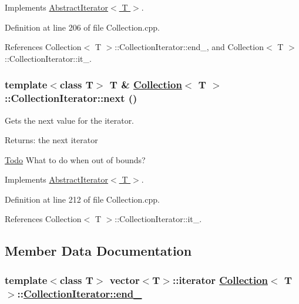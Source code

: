 Implements \hyperlink{classAbstractIterator_a1}{Abstract\-Iterator$<$ T $>$}.

Definition at line 206 of file Collection.cpp.

References Collection$<$ T $>$::Collection\-Iterator::end\_\-, and Collection$<$ T $>$::Collection\-Iterator::it\_\-.\hypertarget{classCollection_1_1CollectionIterator_a3}{
\subsubsection[next]{\setlength{\rightskip}{0pt plus 5cm}template$<$class T$>$ T \& \hyperlink{classCollection}{Collection}$<$ T $>$::Collection\-Iterator::next ()}}
\label{classCollection_1_1CollectionIterator_a3}


Gets the next value for the iterator. \begin{Desc}
\item[Returns:]the next iterator \end{Desc}
\begin{Desc}
\item[\hyperlink{todo__todo000004}{Todo}]What to do when out of bounds? \end{Desc}


Implements \hyperlink{classAbstractIterator_a2}{Abstract\-Iterator$<$ T $>$}.

Definition at line 212 of file Collection.cpp.

References Collection$<$ T $>$::Collection\-Iterator::it\_\-.

\subsection{Member Data Documentation}
\hypertarget{classCollection_1_1CollectionIterator_r1}{
\subsubsection[end\_\-]{\setlength{\rightskip}{0pt plus 5cm}template$<$class T$>$ vector$<$T$>$::iterator \hyperlink{classCollection}{Collection}$<$ T $>$::\hyperlink{classCollection_1_1CollectionIterator_r1}{Collection\-Iterator::end\_\-}}}
\label{classCollection_1_1CollectionIterator_r1}


